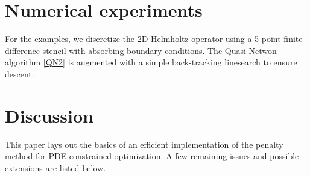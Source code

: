 \documentclass{iopart}
\begin{document}
\section{Numerical experiments}
\label{examples}
For the examples, we discretize the 2D Helmholtz operator using a
5-point finite-difference stencil with absorbing boundary conditions.
The Quasi-Netwon algorithm \ref{QN2} is augmented with a simple
back-tracking linesearch to ensure descent.


\section{Discussion}
\label{discussion}
This paper lays out the basics of an efficient implementation of the
penalty method for PDE-constrained optimization. A few remaining issues
and possible extensions are listed below.
\end{document}
